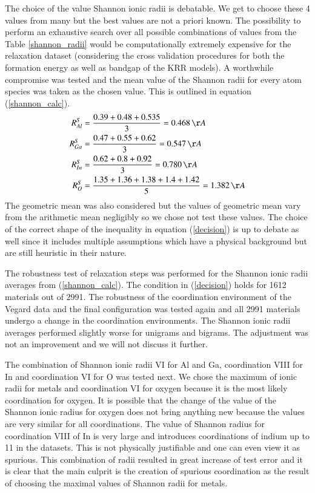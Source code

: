 \documentclass[11pt,oneside,czech,american]{book} %
\theoremstyle{plain}
\theoremstyle{definition}
\begin{document}
The choice of the value Shannon ionic radii is debatable. We get to choose these 4 values from many but the best values are not a priori known. The possibility to perform an exhaustive search over all possible combinations of values from the Table \ref{shannon_radii} would be computationally extremely expensive for the relaxation dataset (considering the cross validation procedures for both the formation energy as well as bandgap of the KRR models). A worthwhile compromise was tested and the mean value of the Shannon radii for every atom species was taken as the chosen value. This is outlined in equation (\ref{shannon_calc}).
\begin{equation}
	\begin{aligned}
		R^S_{Al} &= \frac{0.39+0.48+0.535}{3} = 0.468 \, \AA\\
		R^S_{Ga} &= \frac{0.47+0.55+0.62}{3} = 0.547 \, \AA\\
		R^S_{In} &= \frac{0.62+0.8+0.92}{3} = 0.780 \, \AA\\
		R^S_O &= \frac{1.35+1.36+1.38+1.4+1.42}{5} = 1.382 \, \AA
	\end{aligned}
\label{shannon_calc}
\end{equation}
The geometric mean was also considered but the values of geometric mean vary from the arithmetic mean negligibly so we chose not test these values. The choice of the correct shape of the inequality in equation (\ref{decision}) is up to debate as well since it includes multiple assumptions which have a physical background but are still heuristic in their nature.

The robustness test of relaxation steps was performed for the Shannon ionic radii averages from (\ref{shannon_calc}). The condition in (\ref{decision}) holds for 1612 materials out of 2991. The robustness of the coordination environment of the Vegard data and the final configuration was tested again and all 2991 materials undergo a change in the coordination environments. The Shannon ionic radii averages performed slightly worse for unigrams and bigrams. The adjustment was not an improvement and we will not discuss it further.

The combination of Shannon ionic radii VI for Al and Ga, coordination VIII for In and coordination VI for O was tested next. We chose the maximum of ionic radii for metals and coordination VI for oxygen because it is the most likely coordination for oxygen. It is possible that the change of the value of the Shannon ionic radius for oxygen does not bring anything new because the values are very similar for all coordinations. The value of Shannon radius for coordination VIII of In is very large and introduces coordinations of indium up to 11 in the datasets. This is not physically justifiable and one can even view it as spurious. This combination of radii resulted in great increase of test error and it is clear that the main culprit is the creation of spurious coordination as the result of choosing the maximal values of Shannon radii for metals.
\end{document}
